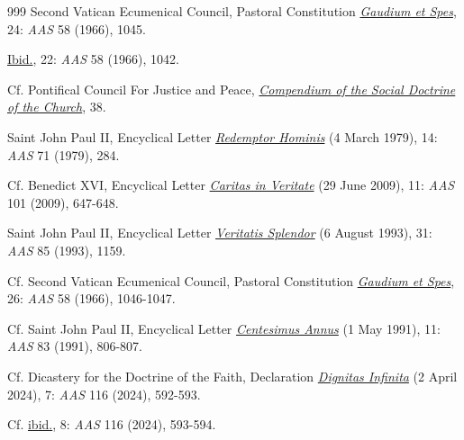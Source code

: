 \documentclass{article}
\begin{document}
\begin{thebibliography}{999}
 Second Vatican Ecumenical Council, Pastoral Constitution \href{https://www.vatican.va/archive/hist_councils/ii_vatican_council/documents/vat-ii_const_19651207_gaudium-et-spes_en.html}{\emph{Gaudium et Spes}}, 24: \emph{AAS} 58 (1966), 1045.

 \href{https://www.vatican.va/archive/hist_councils/ii_vatican_council/documents/vat-ii_const_19651207_gaudium-et-spes_en.html}{Ibid.}, 22: \emph{AAS} 58 (1966), 1042.

 Cf. Pontifical Council For Justice and Peace, \href{https://www.vatican.va/roman_curia/pontifical_councils/justpeace/documents/rc_pc_justpeace_doc_20060526_compendio-dott-soc_en.html}{\emph{Compendium of the Social Doctrine of the Church}}, 38.

 Saint John Paul II, Encyclical Letter \href{https://www.vatican.va/content/john-paul-ii/en/encyclicals/documents/hf_jp-ii_enc_04031979_redemptor-hominis.html}{\emph{Redemptor Hominis}} (4 March 1979), 14: \emph{AAS} 71 (1979), 284.

 Cf. Benedict XVI, Encyclical Letter \href{https://www.vatican.va/content/benedict-xvi/en/encyclicals/documents/hf_ben-xvi_enc_20090629_caritas-in-veritate.html}{\emph{Caritas in Veritate}} (29 June 2009), 11: \emph{AAS} 101 (2009), 647-648.

 Saint John Paul II, Encyclical Letter \href{https://www.vatican.va/content/john-paul-ii/en/encyclicals/documents/hf_jp-ii_enc_06081993_veritatis-splendor.html}{\emph{Veritatis Splendor}} (6 August 1993), 31: \emph{AAS} 85 (1993), 1159.

 Cf. Second Vatican Ecumenical Council, Pastoral Constitution \href{https://www.vatican.va/archive/hist_councils/ii_vatican_council/documents/vat-ii_const_19651207_gaudium-et-spes_en.html}{\emph{Gaudium et Spes}}, 26: \emph{AAS} 58 (1966), 1046-1047.

 Cf. Saint John Paul II, Encyclical Letter \href{https://www.vatican.va/content/john-paul-ii/en/encyclicals/documents/hf_jp-ii_enc_01051991_centesimus-annus.html}{\emph{Centesimus Annus}} (1 May 1991), 11: \emph{AAS} 83 (1991), 806-807.

 Cf. Dicastery for the Doctrine of the Faith, Declaration \href{https://www.vatican.va/roman_curia/congregations/cfaith/documents/rc_ddf_doc_20240402_dignitas-infinita_en.html}{\emph{Dignitas Infinita}} (2 April 2024), 7: \emph{AAS} 116 (2024), 592-593.

 Cf. \href{https://www.vatican.va/roman_curia/congregations/cfaith/documents/rc_ddf_doc_20240402_dignitas-infinita_en.html}{ibid.}, 8: \emph{AAS} 116 (2024), 593-594.


\end{thebibliography}
\end{document}
